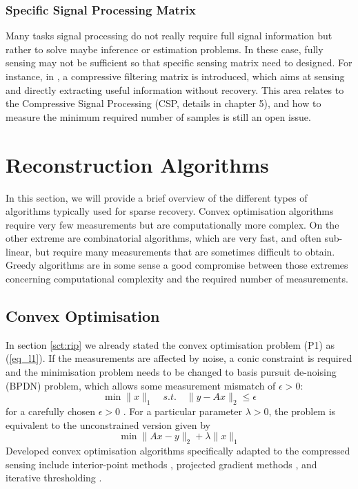 \subsubsection{Specific Signal Processing Matrix}
Many tasks signal processing do not really require full signal information but rather to solve maybe inference or estimation problems. 
In these case, fully sensing may not be sufficient so that specific sensing matrix need to designed. For instance, in \cite{davenport2010signal}, a compressive filtering matrix is introduced, which aims at sensing and directly extracting useful information without recovery. This area relates to the Compressive Signal Processing (CSP, details in chapter 5), and how to measure the minimum required number of samples is still an open issue.  

\section{Reconstruction Algorithms}\label{sct:recon-alg}

In this section, we will provide a brief overview of the different types of algorithms typically used for sparse recovery. Convex optimisation algorithms require very few measurements but are computationally more complex. On the other extreme are combinatorial algorithms, which are very fast, and often sub-linear, but require many measurements that are sometimes difficult to obtain. Greedy algorithms are in some sense a good compromise between those extremes concerning computational complexity and the required number of measurements.

\subsection{Convex Optimisation}\label{sct:convex}

In section \ref{sct:rip} we already stated the convex optimisation problem (P1) as (\ref{eq_l1}). If the measurements are affected by noise, a conic constraint is required and the minimisation problem needs to be changed to basis pursuit de-noising (BPDN) \cite{chen1998atomic} problem, which allows some measurement mismatch of $\epsilon > 0$:
\begin{equation}
\label{eq_bpdn}
\min \| x \|_1 \quad s.t. \quad \| y - A x \|_2 \leq \epsilon
\end{equation}
for a carefully chosen $\epsilon > 0$ . For a particular parameter $\lambda > 0$, the problem is equivalent to the unconstrained version given by
\begin{equation}
\min \| Ax - y \|_2 + \lambda \| x\|_1
\end{equation}
Developed convex optimisation algorithms specifically adapted to the compressed sensing include interior-point methods \cite{candes2006robust}, projected gradient methods \cite{figueiredo2007gradient}, and iterative thresholding \cite{blumensath2009iterative}.

